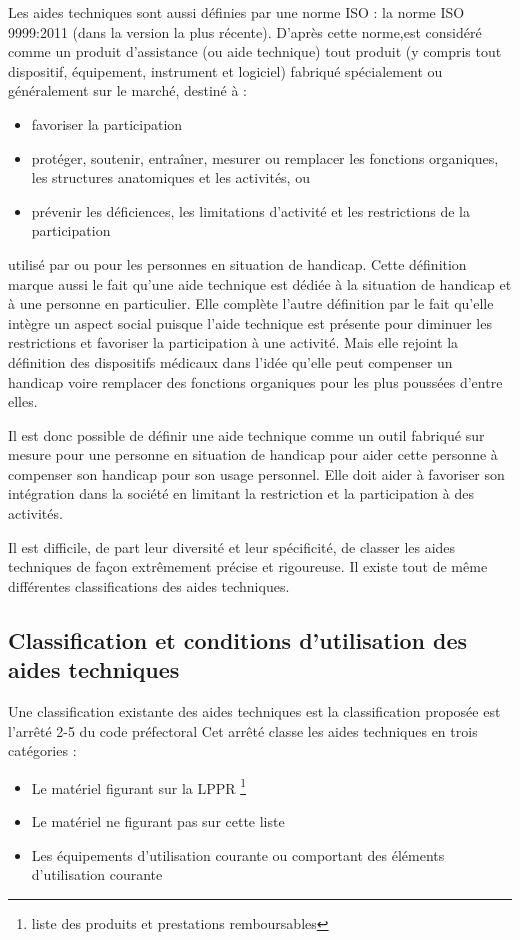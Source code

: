 Les aides techniques sont aussi définies par une norme ISO : la norme ISO 9999:2011 (dans la version la plus récente). D'après cette norme,\og est considéré comme un produit d’assistance (ou aide technique) tout produit (y compris tout dispositif, équipement, instrument et logiciel) fabriqué spécialement ou généralement sur le marché, destiné à :
\begin{itemize}
\item favoriser la participation
\item protéger, soutenir, entraîner, mesurer ou remplacer les fonctions organiques, les structures anatomiques et les activités, ou
\item prévenir les déficiences, les limitations d'activité et les restrictions de la participation
\end{itemize} 
utilisé par ou pour les personnes en situation de handicap\fg .
Cette définition marque aussi le fait qu'une aide technique est dédiée à la situation de handicap et à une personne en particulier. Elle complète l'autre définition par le fait qu'elle intègre un aspect social puisque l'aide technique est présente pour diminuer les restrictions et favoriser la participation à une activité. Mais elle rejoint la définition des dispositifs médicaux dans l'idée qu'elle peut compenser un handicap voire remplacer des fonctions organiques pour les plus poussées d'entre elles.

Il est donc possible de définir une aide technique comme un outil fabriqué sur mesure pour une personne en situation de handicap pour aider cette personne à compenser son handicap pour son usage personnel. Elle doit aider à favoriser son intégration dans la société en limitant la restriction et la participation à des activités. 


Il est difficile, de part leur diversité et leur spécificité, de classer les aides techniques de façon extrêmement précise et rigoureuse. Il existe tout de même différentes classifications des aides techniques.

\subsection{Classification et conditions d'utilisation des aides techniques}
Une classification existante des aides techniques est la classification proposée est l'arrêté 2-5 du code préfectoral
Cet arrêté classe les aides techniques en trois catégories :
\begin{itemize}
\item Le matériel figurant sur la LPPR \footnote{liste des produits et prestations remboursables}
\item Le matériel ne figurant pas sur cette liste
\item Les équipements d'utilisation courante ou comportant des éléments d'utilisation courante
\end{itemize}

